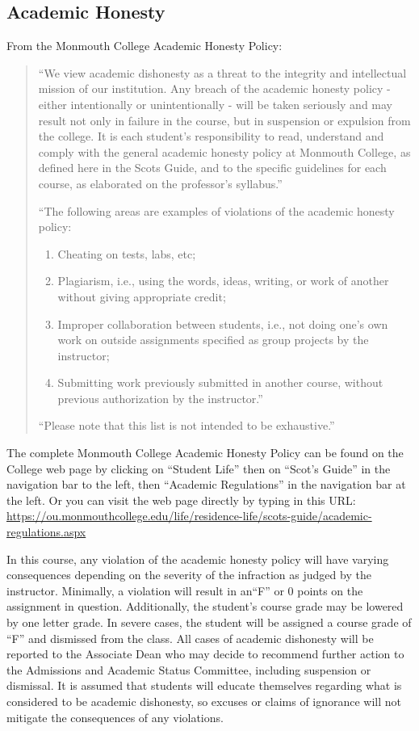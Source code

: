 \documentclass[10pt]{article}
\begin{document}
\subsection{Academic Honesty}

From the Monmouth College Academic Honesty Policy:
\begin{quote}
  ``We view academic dishonesty as a threat to the integrity and intellectual mission of our institution. Any breach of the academic honesty policy - either intentionally or unintentionally - will be taken seriously and may result not only in failure in the course, but in suspension or expulsion from the college. It is each student’s responsibility to read, understand and comply with the general academic honesty policy at Monmouth College, as defined here in the Scots Guide, and to the specific guidelines for each course, as elaborated on the professor’s syllabus.''

  ``The following areas are examples of violations of the academic honesty policy:
  \begin{enumerate}
  \item Cheating on tests, labs, etc;
  \item Plagiarism, i.e., using the words, ideas, writing, or work of another without giving appropriate credit;
  \item Improper collaboration between students, i.e., not doing one’s own work on outside assignments specified as group projects by the instructor;
  \item Submitting work previously submitted in another course, without previous authorization by the instructor.''
  \end{enumerate}

  ``Please note that this list is not intended to be exhaustive.''
\end{quote}

The complete Monmouth College Academic Honesty Policy can be found on the College web page by clicking on ``Student Life'' then on ``Scot’s Guide'' in the navigation bar to the left, then ``Academic Regulations'' in the navigation bar at the left.  Or you can visit the web page directly by typing in this URL: \url{https://ou.monmouthcollege.edu/life/residence-life/scots-guide/academic-regulations.aspx}

In this course, any violation of the academic honesty policy will have varying consequences depending on the severity of the infraction as judged by the instructor. Minimally, a violation will result in an``F'' or 0 points on the assignment in question. Additionally, the student’s course grade may be lowered by one letter grade. In severe cases, the student will be assigned a course grade of ``F'' and dismissed from the class. All cases of academic dishonesty will be reported to the Associate Dean who may decide to recommend further action to the Admissions and Academic Status Committee, including suspension or dismissal. It is assumed that students will educate themselves regarding what is considered to be academic dishonesty, so excuses or claims of ignorance will not mitigate the consequences of any violations.
\end{document}
